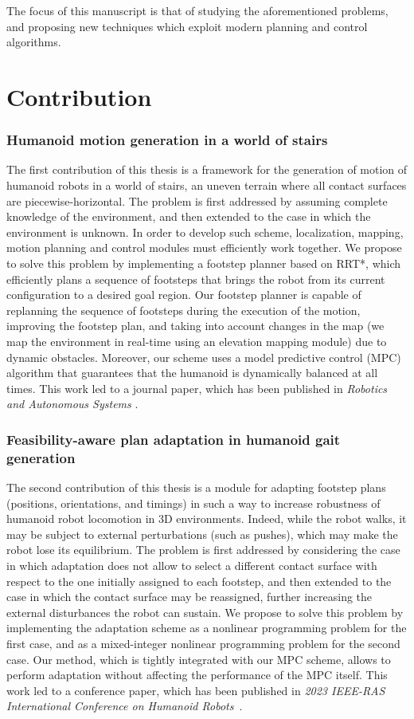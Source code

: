 The focus of this manuscript is that of studying the aforementioned problems,
and proposing new techniques which exploit modern planning and control
algorithms.

\section{Contribution}
\subsubsection{Humanoid motion generation in a world of stairs}
The first contribution of this thesis is a framework for the generation of 
motion of humanoid robots in a world of stairs, an uneven terrain 
where all contact surfaces are piecewise-horizontal. The problem is first 
addressed by assuming complete knowledge of the environment, and then 
extended to the case in which the environment is unknown. In order to 
develop such scheme, localization, mapping, motion planning 
and control modules must efficiently work together. We propose to solve this 
problem by implementing a footstep planner based on RRT*, which efficiently 
plans a sequence of footsteps that brings the robot from its current 
configuration to a desired goal region. Our footstep planner is 
capable of replanning the sequence of footsteps during the execution of the 
motion, improving the footstep plan, and taking into account changes 
in the map (we map the environment in real-time using an elevation mapping 
module) due to dynamic obstacles. Moreover, our scheme
uses a model predictive control (MPC) algorithm that guarantees that the humanoid is
dynamically balanced at all times. This work led to a journal paper, which 
has been published in \textit{Robotics and Autonomous Systems} 
\cite{Cipriano2023RAS}.

\subsubsection{Feasibility-aware plan adaptation in humanoid gait generation}
The second contribution of this thesis is a module for adapting footstep plans 
(positions, orientations, and timings) in such a way to increase robustness 
of humanoid robot locomotion in 3D environments.
Indeed, while the robot walks, it may be subject 
to external perturbations (such as pushes), which may make the robot lose its 
equilibrium. The problem is first addressed by considering the case in which 
adaptation does not allow to select a different contact surface with respect
to the one initially assigned to each footstep, and then extended to the case 
in which the contact surface may be reassigned, further increasing the external 
disturbances the robot can sustain. We propose to solve this problem by 
implementing the adaptation scheme as a nonlinear programming problem for the
first case, and as a mixed-integer nonlinear programming problem for the
second case. Our method, which is tightly integrated with our MPC scheme,
allows to perform adaptation without affecting the performance of the MPC
itself. This work led to a conference paper, which has been published 
in \textit{2023 IEEE-RAS International Conference on Humanoid
Robots}~\cite{Cipriano2023Humanoids}.

